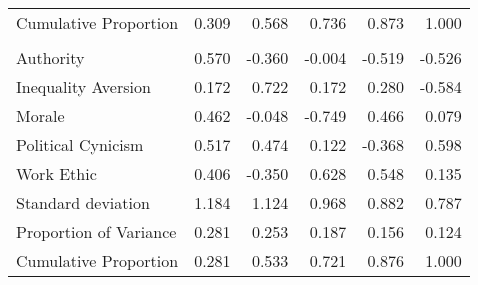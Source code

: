 \begin{tabular}{lrrrrr}
\hspace{1em}Cumulative Proportion & 0.309 & 0.568 & 0.736 & 0.873 & 1.000\\
\addlinespace[0.3em]
\multicolumn{6}{l}{\textbf{Age 42}}\\
\hline
\hspace{1em}Authority & 0.570 & -0.360 & -0.004 & -0.519 & -0.526\\
\hspace{1em}Inequality Aversion & 0.172 & 0.722 & 0.172 & 0.280 & -0.584\\
\hspace{1em}Morale & 0.462 & -0.048 & -0.749 & 0.466 & 0.079\\
\hspace{1em}Political Cynicism & 0.517 & 0.474 & 0.122 & -0.368 & 0.598\\
\hspace{1em}Work Ethic & 0.406 & -0.350 & 0.628 & 0.548 & 0.135\\
\midrule
\hspace{1em}Standard deviation & 1.184 & 1.124 & 0.968 & 0.882 & 0.787\\
\hspace{1em}Proportion of Variance & 0.281 & 0.253 & 0.187 & 0.156 & 0.124\\
\hspace{1em}Cumulative Proportion & 0.281 & 0.533 & 0.721 & 0.876 & 1.000\\
\bottomrule
\end{tabular}

